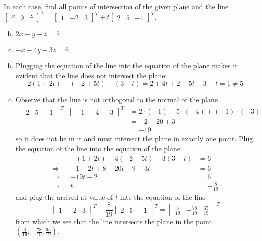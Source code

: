 \documentclass[../main.tex]{subfiles}
\begin{document}
In each case, find all points of intersection of the given plane and the line \\
\(
	\begin{bmatrix}x&y&z\end{bmatrix}^T
	=
	\begin{bmatrix}1&-2&3\end{bmatrix}^T
	+
	t
	\begin{bmatrix}2&5&-1\end{bmatrix}^T
\).
\begin{enumerate}[a)]
	\setcounter{enumi}{1}
	\item $2x - y - z = 5$
	\setcounter{enumi}{3}
	\item $-x - 4y - 3z = 6$
\end{enumerate}

\solution
\begin{enumerate}[a)]
	\setcounter{enumi}{1}
	\item Plugging the equation of the line into the equation of the plane makes it evident that the line does not intersect the plane:
		\[
			2(1 + 2t) - (-2 + 5t) - (3 - t)
			=
			2 + 4t + 2 - 5t - 3 + t 
			=
			1
			\neq
			5
		\]
	\setcounter{enumi}{3}
	\item Observe that the line is not orthogonal to the normal of the plane
		\begin{align*}
			\begin{bmatrix}2&5&-1\end{bmatrix}^T
			\cdot
			\begin{bmatrix}-1&-4&-3\end{bmatrix}^T
			&=
			2\cdot(-1) + 5\cdot(-4) + (-1)\cdot(-3)
			\\&=
			-2 - 20 + 3
			\\&=
			- 19
		\end{align*}
		so it does not lie in it and must intersect the plane in exactly one point.
		Plug the equation of the line into the equation of the plane
		\begin{align*}
			&& -(1 + 2t) - 4(-2 + 5t) - 3(3 - t) &= 6
			\\\Rightarrow &&
			-1 - 2t + 8 - 20t - 9 + 3t &= 6
			\\\Rightarrow &&
			-19t - 2 &= 6
			\\\Rightarrow &&
			t &= -\frac{8}{19}
		\end{align*}
		and plug the arrived at value of $t$ into the equation of the line
		\[
			\begin{bmatrix}1&-2&3\end{bmatrix}^T
			-
			\frac{8}{19}
			\begin{bmatrix}2&5&-1\end{bmatrix}^T
			=
			\begin{bmatrix}
				\frac{3}{19}
				&
				-\frac{78}{19}
				&
				\frac{65}{19}
			\end{bmatrix}^T
		\]
		from which we see that the line intersects the plane in the point $(\frac{3}{19}, -\frac{78}{19}, \frac{65}{19})$.
\end{enumerate}
\end{document}
